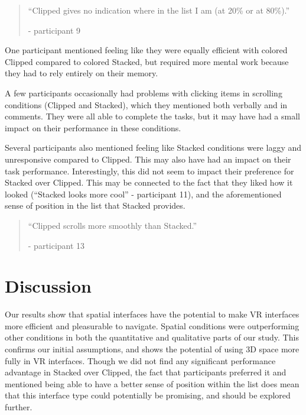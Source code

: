\documentclass[nobib]{tufte-book} %
\begin{document}
\begin{quote}
``Clipped gives no indication where in the list I am (at 20\% or at 80\%).''

- participant 9
\end{quote}

One participant mentioned feeling like they were equally efficient with colored Clipped compared to colored Stacked, but required more mental work because they had to rely entirely on their memory.

A few participants occasionally had problems with clicking items in scrolling conditions (Clipped and Stacked), which they mentioned both verbally and in comments. They were all able to complete the tasks, but it may have had a small impact on their performance in these conditions.

Several participants also mentioned feeling like Stacked conditions were laggy and unresponsive compared to Clipped. This may also have had an impact on their task performance. Interestingly, this did not seem to impact their preference for Stacked over Clipped. This may be connected to the fact that they liked how it looked (``Stacked looks more cool'' - participant 11), and the aforementioned sense of position in the list that Stacked provides.

\begin{quote}
``Clipped scrolls more smoothly than Stacked.''

- participant 13
\end{quote}


\chapter{Discussion}
\label{ch:discussion}

Our results show that spatial interfaces have the potential to make VR interfaces more efficient and pleasurable to navigate. Spatial conditions were outperforming other conditions in both the quantitative and qualitative parts of our study. This confirms our initial assumptions, and shows the potential of using 3D space more fully in VR interfaces. Though we did not find any significant performance advantage in Stacked over Clipped, the fact that participants preferred it and mentioned being able to have a better sense of position within the list does mean that this interface type could potentially be promising, and should be explored further.
\end{document}
